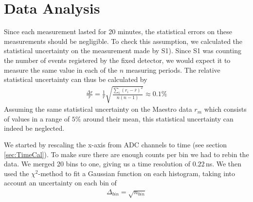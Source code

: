 \documentclass[a4paper,parskip,11pt, DIV12]{scrreprt}
\begin{document}
\chapter{Data Analysis}
Since each measurement lasted for 20 minutes, the statistical errors on these measurements should be negligible. To check this assumption, we calculated the statistical uncertainty on the measurement made by S1). Since S1 was counting the number of events registered by the fixed detector, we would expect it to measure the same value in each of the $n$ measuring periods. The relative statistical uncertainty can thus be calculated by
%
\begin{align}
\frac{\Delta r}{\overline{r}} = \frac{1}{\overline{r}}\sqrt{\frac{\sum_i (r_i - \overline{r})^2}{n(n-1)}} \approx 0.1\%
\end{align}
%
Assuming the same statistical uncertainty on the Maestro data $r_m$ which consists of values in a range of $5\%$ around their mean, this statistical uncertainty can indeed be neglected.



We started by rescaling the x-axis from ADC channels to time (see section \ref{sec:TimeCal}). To make sure there are enough counts per bin we had to rebin the data. We merged 20 bins to one, giving us a time resolution of $0.22\,$ns. We then used the $\chi^2$-method to fit a Gaussian function on each histogram, taking into account an uncertainty on each bin of 
%
\begin{align}
\Delta_{bin} = \sqrt{n_{bin}}
\end{align}
\end{document}
